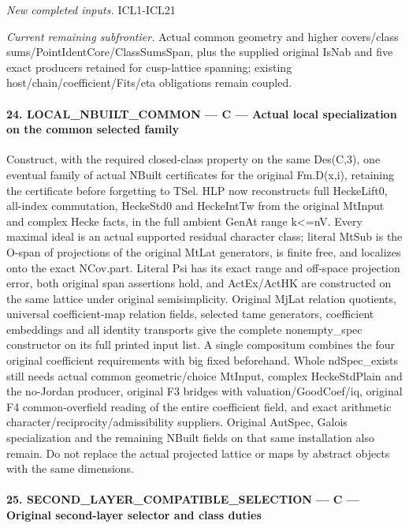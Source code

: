 \documentclass[11pt,a4paper]{article}
\numberwithin{equation}{section}
\theoremstyle{remark}\newtheorem{remark}[theorem]{Remark}
\begin{document}
\emph{New completed inputs.} ICL1-ICL21

\emph{Current remaining subfrontier.} Actual common geometry and higher covers/class sums/PointIdentCore/ClassSumsSpan, plus the supplied original IsNab and five exact producers retained for cusp-lattice spanning; existing host/chain/coefficient/Fits/eta obligations remain coupled.



\paragraph{24. LOCAL\_\allowbreak NBUILT\_\allowbreak COMMON — C — Actual local specialization on the common selected family}

Construct, with the required closed-class property on the same Des(C,3), one eventual family of actual NBuilt certificates for the original Fm.D(x,i), retaining the certificate before forgetting to TSel. HLP now reconstructs full HeckeLift0, all-index commutation, HeckeStd0 and HeckeIntTw from the original MtInput and complex Hecke facts, in the full ambient GenAt range k<=nV. Every maximal ideal is an actual supported residual character class; literal MtSub is the O-span of projections of the original MtLat generators, is finite free, and localizes onto the exact NCov.part. Literal Psi has its exact range and off-space projection error, both original span assertions hold, and ActEx/ActHK are constructed on the same lattice under original semisimplicity. Original MjLat relation quotients, universal coefficient-map relation fields, selected tame generators, coefficient embeddings and all identity transports give the complete nonempty\_\allowbreak spec constructor on its full printed input list. A single compositum combines the four original coefficient requirements with big fixed beforehand. Whole ndSpec\_\allowbreak exists still needs actual common geometric/choice MtInput, complex HeckeStdPlain and the no-Jordan producer, original F3 bridges with valuation/GoodCoef/iq, original F4 common-overfield reading of the entire coefficient field, and exact arithmetic character/reciprocity/admissibility suppliers. Original AutSpec, Galois specialization and the remaining NBuilt fields on that same installation also remain. Do not replace the actual projected lattice or maps by abstract objects with the same dimensions.



\paragraph{25. SECOND\_\allowbreak LAYER\_\allowbreak COMPATIBLE\_\allowbreak SELECTION — C — Original second-layer selector and class duties}
\end{document}
